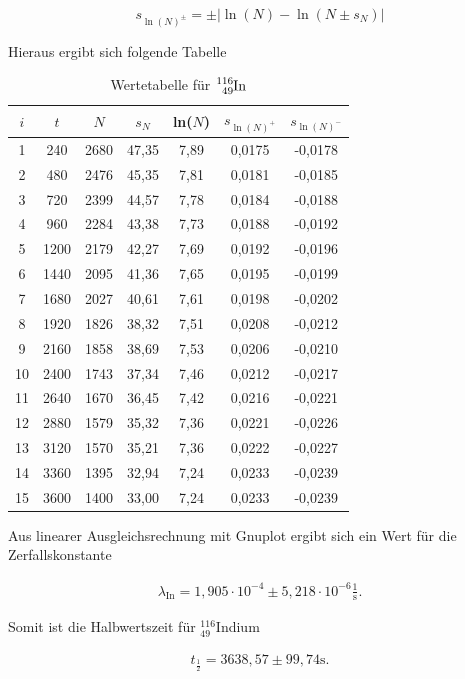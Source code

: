 \begin{equation}
 s_{\ln(N)^{\pm}} = \pm \left|\ln(N)-\ln(N\pm s_N)\right|
\end{equation}

Hieraus ergibt sich folgende Tabelle

\renewcommand{\arraystretch}{1.25}
\begin{table}[h]
 \begin{tabular}{c|c|c|c|c|c|c}
 $i$ & $t$ & $N$ & $s_N$ & ln($N$) & $s_{\ln(N)^+}$ & $s_{\ln(N)^-}$ \\
 \hline
 1&	240&	2680&	47,35&	7,89&	0,0175&	-0,0178\\
2&	480&	2476&	45,35&	7,81&	0,0181&	-0,0185\\
3&	720&	2399&	44,57&	7,78&	0,0184&	-0,0188\\
4&	960&	2284&	43,38&	7,73&	0,0188&	-0,0192\\
5&	1200&	2179&	42,27&	7,69&	0,0192&	-0,0196\\
6&	1440&	2095&	41,36&	7,65&	0,0195&	-0,0199\\
7&	1680&	2027&	40,61&	7,61&	0,0198&	-0,0202\\
8&	1920&	1826&	38,32&	7,51&	0,0208&	-0,0212\\
9&	2160&	1858&	38,69&	7,53&	0,0206&	-0,0210\\
10&	2400&	1743&	37,34&	7,46&	0,0212&	-0,0217\\
11&	2640&	1670&	36,45&	7,42&	0,0216&	-0,0221\\
12&	2880&	1579&	35,32&	7,36&	0,0221&	-0,0226\\
13&	3120&	1570&	35,21&	7,36&	0,0222&	-0,0227\\
14&	3360&	1395&	32,94&	7,24&	0,0233&	-0,0239\\
15&	3600&	1400&	33,00&	7,24&	0,0233&	-0,0239\\
\end{tabular}
\caption{Wertetabelle für $\ce{^{116}_{49}In}$}
\end{table}
\renewcommand{\arraystretch}{1}

Aus linearer Ausgleichsrechnung mit Gnuplot ergibt sich ein Wert für die Zerfallskonstante 

\begin{align}
\lambda_{\text{In}} = 1,905 \cdot 10^{-4} \pm 5,218 \cdot 10^{-6} \frac{1}{\text{s}}.
\end{align}

Somit ist die Halbwertszeit für $^{116}_{49}$Indium

\begin{align}
 t_{\frac12} = 3638,57 \pm 99,74 \text{s}.
 \label{in}
\end{align}

